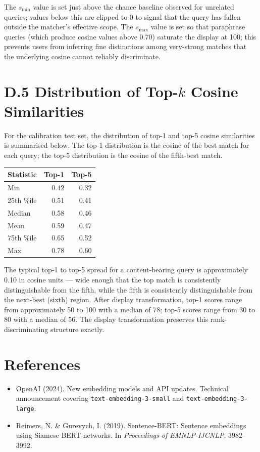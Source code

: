 \documentclass[11pt]{article}
\begin{document}
The $s_{\min}$ value is set just above the chance baseline observed for unrelated queries; values below this are clipped to 0 to signal that the query has fallen outside the matcher's effective scope. The $s_{\max}$ value is set so that paraphrase queries (which produce cosine values above 0.70) saturate the display at 100; this prevents users from inferring fine distinctions among very-strong matches that the underlying cosine cannot reliably discriminate.

\section*{D.5 Distribution of Top-$k$ Cosine Similarities}
For the calibration test set, the distribution of top-1 and top-5 cosine similarities is summarised below. The top-1 distribution is the cosine of the best match for each query; the top-5 distribution is the cosine of the fifth-best match.

\begin{center}
\begin{tabular}{@{}lrr@{}}
\toprule
Statistic & Top-1 & Top-5 \\
\midrule
Min     & 0.42 & 0.32 \\
25th \%ile & 0.51 & 0.41 \\
Median  & 0.58 & 0.46 \\
Mean    & 0.59 & 0.47 \\
75th \%ile & 0.65 & 0.52 \\
Max     & 0.78 & 0.60 \\
\bottomrule
\end{tabular}
\end{center}

The typical top-1 to top-5 spread for a content-bearing query is approximately 0.10 in cosine units --- wide enough that the top match is consistently distinguishable from the fifth, while the fifth is consistently distinguishable from the next-best (sixth) region. After display transformation, top-1 scores range from approximately 50 to 100 with a median of 78; top-5 scores range from 30 to 80 with a median of 56. The display transformation preserves this rank-discriminating structure exactly.

\section*{References}

\begin{itemize}[leftmargin=2em,itemsep=0.2em]
\item OpenAI (2024). New embedding models and API updates. Technical announcement covering \texttt{text-embedding-3-small} and \texttt{text-embedding-3-large}.
\item Reimers, N. \& Gurevych, I. (2019). Sentence-BERT: Sentence embeddings using Siamese BERT-networks. In \emph{Proceedings of EMNLP-IJCNLP}, 3982--3992.
\end{itemize}
\end{document}
